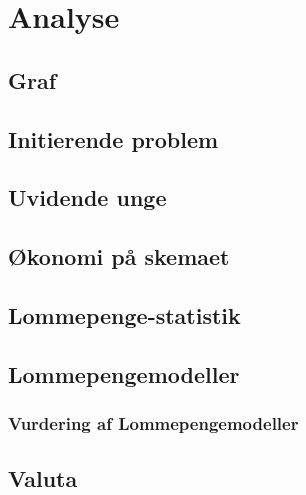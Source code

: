 





\tableofcontents

\chapter{Analyse}

\section{Graf}


\section{Initierende problem}


\section{Uvidende unge}
\label{UvidendeUnge}


\section{Økonomi på skemaet}
\label{Okonomi}


\section{Lommepenge-statistik}
\label{LommeStat}


\section{Lommepengemodeller}
\label{LommeModeller}

\subsection{Vurdering af Lommepengemodeller}
\label{ModelVurdering}


\section{Valuta}
\label{Valuta}


